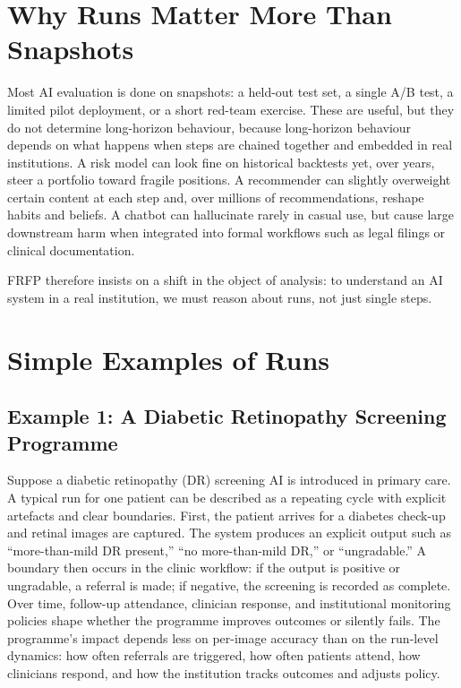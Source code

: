 \section{Why Runs Matter More Than Snapshots}

Most AI evaluation is done on snapshots: a held-out test set, a single A/B test, a limited pilot deployment, or a short red-team exercise. These are useful, but they do not determine long-horizon behaviour, because long-horizon behaviour depends on what happens when steps are chained together and embedded in real institutions. A risk model can look fine on historical backtests yet, over years, steer a portfolio toward fragile positions. A recommender can slightly overweight certain content at each step and, over millions of recommendations, reshape habits and beliefs. A chatbot can hallucinate rarely in casual use, but cause large downstream harm when integrated into formal workflows such as legal filings or clinical documentation.

FRFP therefore insists on a shift in the object of analysis: to understand an AI system in a real institution, we must reason about runs, not just single steps.

\section{Simple Examples of Runs}

\subsection*{Example 1: A Diabetic Retinopathy Screening Programme}

Suppose a diabetic retinopathy (DR) screening AI is introduced in primary care. A typical run for one patient can be described as a repeating cycle with explicit artefacts and clear boundaries. First, the patient arrives for a diabetes check-up and retinal images are captured. The system produces an explicit output such as ``more-than-mild DR present,'' ``no more-than-mild DR,'' or ``ungradable.'' A boundary then occurs in the clinic workflow: if the output is positive or ungradable, a referral is made; if negative, the screening is recorded as complete. Over time, follow-up attendance, clinician response, and institutional monitoring policies shape whether the programme improves outcomes or silently fails. The programme’s impact depends less on per-image accuracy than on the run-level dynamics: how often referrals are triggered, how often patients attend, how clinicians respond, and how the institution tracks outcomes and adjusts policy.

